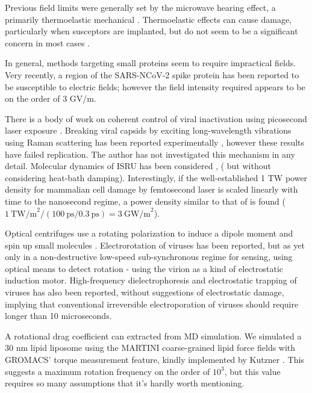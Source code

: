 \documentclass[paper.tex]{subfiles}
\begin{document}
\begin{multicols}{1}
Previous field limits were generally set by the microwave hearing effect, a primarily thermoelastic mechanical \cite{MICROWAVEINDUCED1975}. Thermoelastic effects can cause damage\cite{MECHANICAL1968}, particularly when susceptors are implanted\cite{Thermoacoustic2017}, but do not seem to be a significant concern in most cases \cite{Radiation1996}.

In general, methods targeting small proteins seem to require impractical fields\cite{Picosecond2016b}. Very recently, a region of the SARS-NCoV-2 spike protein has been reported to be susceptible to electric fields\cite{Receptor2021}; however the field intensity required appears to be on the order of 3 GV/m.

There is a body of work on coherent control of viral inactivation using picosecond laser exposure \cite{Maximum2010}. Breaking viral capsids by exciting long-wavelength vibrations using Raman scattering has been reported experimentally \cite{Inactivation2007}\cite{Prospects2012}\cite{Studies2014}, however these results have failed replication\cite{No2011}. The author has not investigated this mechanism in any detail. Molecular dynamics of ISRU has been considered \cite{Maximum2010}, (\cite{Vibrational2009} but without considering heat-bath damping). Interestingly, if the well-established 1 TW power density\cite{Targeted2002} for mammalian cell damage by femtosecond laser is scaled linearly with time to the nanosecond regime, a power density similar to that of \cite{Repeated2020} is found ($1\ \text{TW/m}^2 / (100\ \text{ps} / 0.3\ \text{ps}) = 3\ \text{GW/m}^2$). 

Optical centrifuges use a rotating polarization to induce a dipole moment and spin up small molecules \cite{Forced2000}\cite{Spinning2000}. Electrorotation\cite{RotatingFieldInduced1982}\cite{Electrorotation1988}\cite{Electrorotation1997}\cite{Dielectric1988} of viruses has been reported\cite{Analysis2004}\cite{New1999}\cite{comprehensive2001}, but as yet only in a non-destructive low-speed sub-synchronous regime for sensing, using optical means to detect rotation - using the virion as a kind of electrostatic induction motor. High-frequency dielectrophoresis and electrostatic trapping of viruses has also been reported\cite{Accumulation2006}, without suggestions of electrostatic damage, implying that conventional irreversible electroporation of viruses should require longer than 10 microseconds.

A rotational drag coefficient can extracted from MD simulation\cite{Evaluating2017}. We simulated a 30 nm lipid liposome using the MARTINI coarse-grained \cite{MARTINI2007}\cite{BUMPy2018}\cite{Tsjerk2020} lipid force fields with GROMACS\cite{GROMACS2005}' torque measurement feature, kindly implemented by Kutzner \cite{Keep2011}. This suggests a maximum rotation frequency on the order of $10^3$, but this value requires so many assumptions that it's hardly worth mentioning.


\end{multicols}
\end{document}
